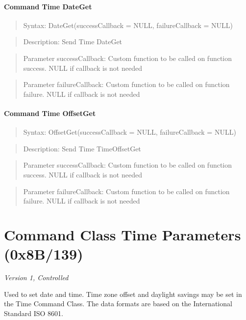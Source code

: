 \paragraph{Command Time DateGet}
\begin{quote}Syntax: DateGet(successCallback = NULL, failureCallback = NULL)\end{quote}
\begin{quote}Description: Send Time DateGet\end{quote}
\begin{quote}Parameter successCallback: Custom function to be called on function success. NULL if callback is not needed\end{quote}
\begin{quote}Parameter failureCallback: Custom function to be called on function failure. NULL if callback is not needed\end{quote}


\paragraph{Command Time OffsetGet}
\begin{quote}Syntax: OffsetGet(successCallback = NULL, failureCallback = NULL)\end{quote}
\begin{quote}Description: Send Time TimeOffsetGet\end{quote}
\begin{quote}Parameter successCallback: Custom function to be called on function success. NULL if callback is not needed\end{quote}
\begin{quote}Parameter failureCallback: Custom function to be called on function failure. NULL if callback is not needed\end{quote}



\section{Command Class Time Parameters (0x8B/139)}

\textit{Version 1, Controlled}
\newline

Used to set date and time. Time zone offset and daylight savings may be set in the Time Command Class. The data formats are based on the International Standard ISO 8601.
